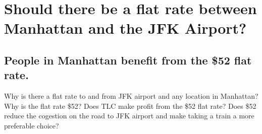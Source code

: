 \documentclass[12pt,twoside]{reedthesis}
\theoremstyle{definition}
\theoremstyle{definition}
\theoremstyle{definition}
\theoremstyle{remark}
\begin{document}
\section{Should there be a flat rate between Manhattan and the JFK
Airport?}\label{should-there-be-a-flat-rate-between-manhattan-and-the-jfk-airport}

\subsection{People in Manhattan benefit from the \$52 flat
rate.}\label{people-in-manhattan-benefit-from-the-52-flat-rate.}

Why is there a flat rate to and from JFK airport and any location in
Manhattan? Why is the flat rate \$52? Does TLC make profit from the \$52
flat rate? Does \$52 reduce the cogestion on the road to JFK airport and
make taking a train a more preferable choice?
\end{document}
